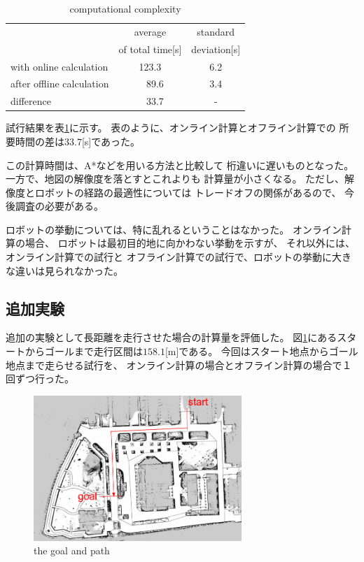 \documentclass{jarticle}
\begin{document}
\begin{table}[hbtp]
	\caption{computational complexity}
	\label{table:result}
	\centering
	\begin{small}
	 \begin{tabular}{l|cc}
		\hline
		 & average & standard \\
		 & of total time[s] & deviation[s] \\
		\hline \hline
		with online calculation & 123.3 & 6.2 \\
		after offline calculation &\ \ 89.6 & 3.4 \\
		\hline
		 difference & \ \ 33.7 & - \\
		\hline
	 \end{tabular}
	\end{small}
\end{table}

試行結果を表\ref{table:result}に示す。
表のように、オンライン計算とオフライン計算での
所要時間の差は$33.7$[s]であった。

この計算時間は、A*などを用いる方法と比較して
桁違いに遅いものとなった。
一方で、地図の解像度を落とすとこれよりも
計算量が小さくなる。
ただし、解像度とロボットの経路の最適性については
トレードオフの関係があるので、
今後調査の必要がある。

ロボットの挙動については、特に乱れるということはなかった。
オンライン計算の場合、
ロボットは最初目的地に向かわない挙動を示すが、
それ以外には、オンライン計算での試行と
オフライン計算での試行で、ロボットの挙動に大きな違いは見られなかった。

\subsection{追加実験}

追加の実験として長距離を走行させた場合の計算量を評価した。
図\ref{fig:tsudanuma-long-path}にあるスタートからゴールまで走行区間は$158.1$[m]である。
今回はスタート地点からゴール地点まで走らせる試行を、
オンライン計算の場合とオフライン計算の場合で１回ずつ行った。

\begin{figure}[htb]
  \centering
   \includegraphics[height=55mm]{./figs/tsudanuma-long.png}
   \caption{the goal and path}
	\label{fig:tsudanuma-long-path}
\end{figure}
\end{document}
